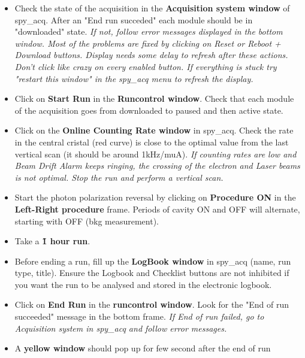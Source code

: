 {{\begin{itemize}
\begin{itemize}
\item Check Random, Mouly and central cristal are activated.
\item Check {\bf Raw data rates}. Assuming a trigger rate of 1kHz/muA, 
   prescaler factors should keep the read data rates at the few kHz level.
\item Check the trigger condition in {\bf General Daq setup} (Photon only, 
   e only, coinc, ...). 
\end{itemize}
\item Check the state of the acquisition in the {\bf Acquisition system window} 
of spy\_acq. After an "End run succeded" each module should be in "downloaded" 
state. 
{\it If not, follow error messages displayed in the bottom window. Most of 
the problems are fixed by clicking on Reset or Reboot + Download buttons. Display needs 
some delay to refresh after these  actions. Don't click like crazy on every 
enabled button. If everything is stuck try "restart this window" in the 
spy\_acq menu to refresh the display.}
\item Click on {\bf Start Run} in the {\bf Runcontrol window}. Check that 
each module of the acquisition goes from downloaded to paused and then active 
state.
\item Click on the {\bf Online Counting Rate window} in spy\_acq. Check the rate 
in the central cristal (red curve) is close to the optimal value from the last 
vertical scan (it should be around 1kHz/muA).
{\it If counting rates are low and Beam Drift Alarm keeps ringing, the 
crossing of the electron and Laser beams is not optimal. Stop the run and 
perform a 
vertical scan.}
\item Start the photon polarization reversal by clicking on {\bf Procedure ON} 
in the {\bf Left-Right procedure} frame. Periods of cavity ON and OFF will 
alternate, starting with OFF (bkg measurement).
\item Take a {\bf \~1 hour run}.
\item Before ending a run, fill up the {\bf LogBook window} in spy\_acq (name, 
run type, title). Ensure the Logbook and Checklist buttons are not inhibited
if you want the run to be analysed and stored in the electronic logbook.
\item Click on {\bf End Run} in the {\bf runcontrol window}. Look for the 
"End of run succeeded" message in the bottom frame.
{\it If End of run failed, go to Acquisition system in spy\_acq and follow 
error messages.}
\item A {\bf yellow window} should pop up for few second after the end of run 

\end{itemize}}}
